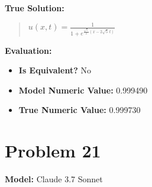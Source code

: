 \documentclass{article}
\begin{document}
\textbf{True Solution:}
\begin{quote}
$u(x,t) =\frac{1}{1 + e^{\frac{\sqrt{5}}{2}(x - 2\sqrt{5}\, t)}}$
\end{quote}

\textbf{Evaluation:}
\begin{itemize}
\item \textbf{Is Equivalent?} No
\item \textbf{Model Numeric Value:} 0.999490
\item \textbf{True Numeric Value:} 0.999730
\end{itemize}
\vspace{1cm}
\section*{Problem 21}
\textbf{Model:} Claude 3.7 Sonnet
\end{document}
